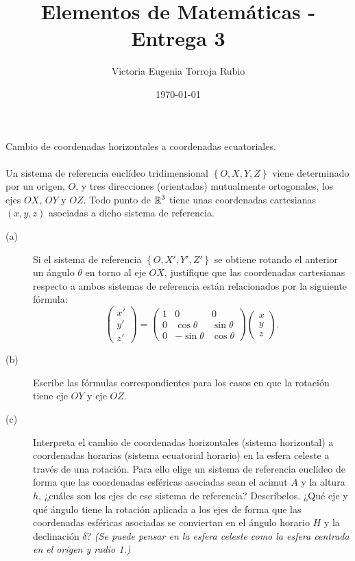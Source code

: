 \documentclass{article}
\begin{document}
\title{Elementos de Matemáticas - Entrega 3}
\author{Victoria Eugenia Torroja Rubio}
\date{\today}

\maketitle

\begin{ej}
Cambio de coordenadas horizontales a coordenadas ecuatoriales. \\ \\
Un sistema de referencia euclídeo tridimensional $\displaystyle \left\{ O, X, Y, Z\right\}  $ viene determinado por un origen, $\displaystyle O $, y tres direcciones (orientadas) mutualmente ortogonales, los ejes $\displaystyle OX $, $\displaystyle OY $ y $\displaystyle OZ $. Todo punto de $\displaystyle \mathbb{R}^{3} $ tiene unas coordenadas cartesianas $\displaystyle \left(x,y,z\right) $ asociadas a dicho sistema de referencia.
\begin{description}
	\item[(a)] Si el sistema de referencia $\displaystyle \left\{ O, X', Y', Z'\right\}  $ se obtiene rotando el anterior un ángulo $\displaystyle \theta $ en torno al eje $\displaystyle OX $, justifique que las coordenadas cartesianas respecto a ambos sistemas de referencia están relacionados por la siguiente fórmula:
		\[\begin{pmatrix} x' \\ y' \\ z' \end{pmatrix} = \begin{pmatrix} 1 & 0 & 0 \\ 0 & \cos \theta & \sin \theta \\ 0 & - \sin \theta & \cos \theta  \end{pmatrix}\begin{pmatrix} x \\ y \\ z \end{pmatrix} .\]
	\item[(b)] Escribe las fórmulas correspondientes para los casos en que la rotación tiene eje $\displaystyle OY $ y eje $\displaystyle OZ $.
	\item[(c)] Interpreta el cambio de coordenadas horizontales (sistema horizontal) a coordenadas horarias (sistema ecuatorial horario) en la esfera celeste a través de una rotación. Para ello elige un sistema de referencia euclídeo de forma que las coordenadas esféricas asociadas sean el acimut $\displaystyle A $ y la altura $\displaystyle h $, ¿cuáles son los ejes de ese sistema de referencia? Descríbelos. ¿Qué eje y qué ángulo tiene la rotación aplicada a los ejes de forma que las coordenadas esféricas asociadas se conviertan en el ángulo horario $\displaystyle H $ y la declinación $\displaystyle \delta  $? \textit{(Se puede pensar en la esfera celeste como la esfera centrada en el origen y radio 1.)}

\end{description}
\end{ej}
\end{document}
